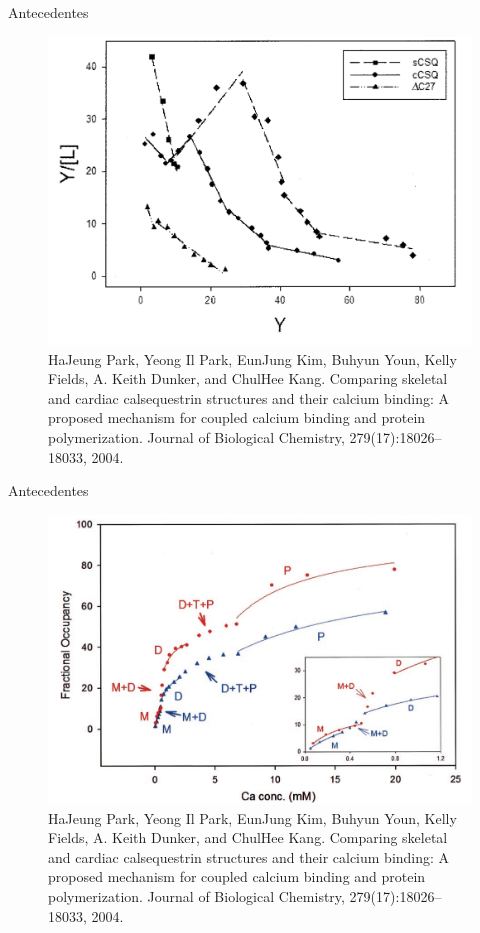 \begin{frame}{Antecedentes}
	
	\begin{figure}[h]
		\includegraphics[width=.8\textwidth]{FIGURA10}
		\caption{{\tiny HaJeung Park, Yeong Il Park, EunJung Kim, Buhyun Youn, Kelly Fields, A. Keith Dunker, and
				ChulHee Kang. Comparing skeletal and cardiac calsequestrin structures and their calcium
				binding: A proposed mechanism for coupled calcium binding and protein polymerization.
				Journal of Biological Chemistry, 279(17):18026–18033, 2004.}}
	\end{figure}
	
\end{frame}

\begin{frame}{Antecedentes}
	
	\begin{figure}[h]
		\includegraphics[width=.8\textwidth]{FIGURA11}
		\caption{{\tiny HaJeung Park, Yeong Il Park, EunJung Kim, Buhyun Youn, Kelly Fields, A. Keith Dunker, and
				ChulHee Kang. Comparing skeletal and cardiac calsequestrin structures and their calcium
				binding: A proposed mechanism for coupled calcium binding and protein polymerization.
				Journal of Biological Chemistry, 279(17):18026–18033, 2004.}}
	\end{figure}
	
\end{frame}

